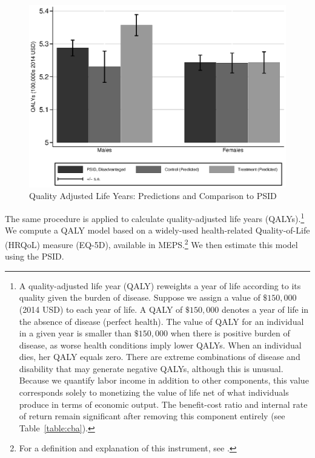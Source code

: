 \begin{figure}[!htbp]
\caption{Quality Adjusted Life Years: Predictions and Comparison to PSID}\label{fig:qalys}
\centering
\includegraphics[width=.7\columnwidth]{output/qalyexppsid.eps}
\end{figure}

The same procedure is applied to calculate quality-adjusted life years (QALYs).\footnote{A quality-adjusted life year (QALY) reweights a year of life according to its quality given the burden of disease. Suppose we assign a value of $\$150,000$ (2014 USD) to each year of life. A QALY of $\$150,000$ denotes a year of life in the absence of disease (perfect health). The value of QALY for an individual in a given year is smaller than $\$150,000$ when there is positive burden of disease, as worse health conditions imply lower QALYs. When an individual dies, her QALY equals zero. There are extreme combinations of disease and disability that may generate negative QALYs, although this is unusual. Because we quantify labor income in addition to other components, this value corresponds solely to monetizing the value of life net of what individuals produce in terms of economic output. The benefit-cost ratio and internal rate of return remain significant after removing this component entirely (see Table~\ref{table:cba}).} We compute a QALY model based on a widely-used health-related Quality-of-Life (HRQoL) measure (EQ-5D), available in MEPS.\footnote{For a definition and explanation of this instrument, see \citet{Dolan_1997_Modeling_MC,Shaw_etal_2005_EQ5D_MC}.} We then estimate this model using the PSID.

